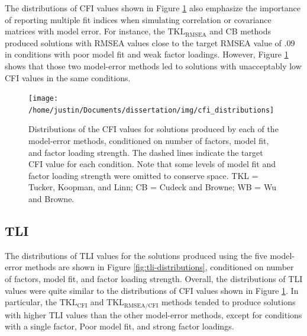 \documentclass[11pt]{umnthesis}
\begin{document}
The distributions of CFI values shown in Figure \ref{fig:cfi-distributions} also emphasize the importance of reporting multiple fit indices when simulating correlation or covariance matrices with model error. For instance, the \(\textrm{TKL}_{\textrm{RMSEA}}\) and CB methods produced solutions with RMSEA values close to the target RMSEA value of .09 in conditions with poor model fit and weak factor loadings. However, Figure \ref{fig:cfi-distributions} shows that those two model-error methods led to solutions with unacceptably low CFI values in the same conditions.

\begin{figure}

{\centering \texttt{[image: /home/justin/Documents/dissertation/img/cfi\_distributions]} 

}

\caption[Distributions of the CFI values for solutions produced by each of the model-error methods, conditioned on number of factors, model fit, and factor loading strength]{Distributions of the CFI values for solutions produced by each of the model-error methods, conditioned on number of factors, model fit, and factor loading strength. The dashed lines indicate the target CFI value for each condition. Note that some levels of model fit and factor loading strength were omitted to conserve space. TKL = Tucker, Koopman, and Linn; CB = Cudeck and Browne; WB = Wu and Browne.}\label{fig:cfi-distributions}
\end{figure}

\hypertarget{tli}{%
\subsection{TLI}\label{tli}}

The distributions of TLI values for the solutions produced using the five model-error methods are shown in Figure \ref{fig:tli-distributions}, conditioned on number of factors, model fit, and factor loading strength. Overall, the distributions of TLI values were quite similar to the distributions of CFI values shown in Figure \ref{fig:cfi-distributions}. In particular, the \(\textrm{TKL}_{\textrm{CFI}}\) and \(\textrm{TKL}_{\textrm{RMSEA/CFI}}\) methods tended to produce solutions with higher TLI values than the other model-error methods, except for conditions with a single factor, Poor model fit, and strong factor loadings.
\end{document}
